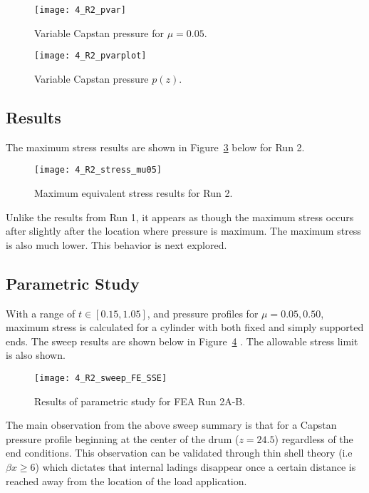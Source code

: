 \begin{figure}[H]
	\centering
	\texttt{[image: 4\_R2\_pvar]}
	\caption{Variable Capstan pressure for $\mu=0.05$.}
	\label{fig:4_R2_pvar}
\end{figure}
\begin{figure}[H]
	\centering
	\texttt{[image: 4\_R2\_pvarplot]}
	\caption{Variable Capstan pressure $p(z)$.}
	\label{fig:4_R2_pvarplot}
\end{figure}

\subsection{Results}

The maximum stress results are shown in Figure~\ref{fig:4_R2_stress_mu05} below for Run 2.

\begin{figure}[H]
	\centering
	\texttt{[image: 4\_R2\_stress\_mu05]}
	\caption{Maximum equivalent stress results for Run 2.}
	\label{fig:4_R2_stress_mu05}
\end{figure}

Unlike the results from Run 1, it appears as though the maximum stress occurs after slightly after the location where pressure is maximum. The maximum stress is also much lower. This behavior is next explored.

\subsection{Parametric Study}

With a range of $t\in [0.15, 1.05]$, and pressure profiles for $\mu =0.05, 0.50$, maximum stress is calculated for a cylinder with both fixed and simply supported ends. The sweep results are shown below in Figure~\ref{fig:4_R2_sweep} \cite{EXCEL}.  The allowable stress limit is also shown.

\begin{figure}[H]
	\centering
	\texttt{[image: 4\_R2\_sweep\_FE\_SSE]}
	\caption{Results of parametric study for FEA Run 2A-B.}
	\label{fig:4_R2_sweep}
\end{figure}

The main observation from the above sweep summary is that for a Capstan pressure profile beginning at the center of the drum ($z=24.5$) regardless of the end conditions. This observation can be validated through thin shell theory (i.e $\beta x \geq 6$) which dictates that internal ladings disappear once a certain distance is reached away from the location of the load application.\\

